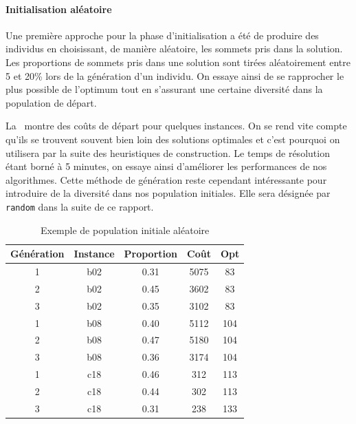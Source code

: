 \documentclass[10pt]{article}
\begin{document}
		\paragraph{Initialisation aléatoire}{
			Une première approche pour la phase d'initialisation a été de produire des individus en choisissant, de manière aléatoire, les sommets pris dans la solution. Les proportions de sommets pris dans une solution sont tirées aléatoirement entre 5 et 20\% lors de la génération d'un individu. On essaye ainsi de se rapprocher le plus possible de l'optimum tout en s'assurant une certaine diversité dans la population de départ.
			
			La~ montre des coûts de départ pour quelques instances. On se rend vite compte qu'ils se trouvent souvent bien loin des solutions optimales et c'est pourquoi on utilisera par la suite des heuristiques de construction. Le temps de résolution étant borné à 5 minutes, on essaye ainsi d'améliorer les performances de nos algorithmes. Cette méthode de génération reste cependant intéressante pour introduire de la diversité dans nos population initiales. Elle sera désignée par \texttt{random} dans la suite de ce rapport.
			
			\begin{table}[h!]
				\centering
				\begin{tabular}{|c|c|c|c|c|}
					\hline
					\textbf{Génération} & \textbf{Instance} & \textbf{Proportion} & \textbf{Coût} & \textbf{Opt} \\
					\hline
					1&b02  & 0.31 & 5075 & 83 \\
					2&b02  & 0.45 & 3602 & 83 \\
					3&b02  & 0.35 & 3102 & 83 \\
					1&b08  & 0.40 & 5112 & 104 \\
					2&b08  & 0.47 & 5180 & 104 \\
					3&b08  & 0.36 & 3174 & 104 \\
					1&c18  & 0.46 & 312 & 113 \\
					2&c18  & 0.44 & 302 & 113 \\
					3&c18  & 0.31 & 238 & 133 \\
					\hline
				\end{tabular}
				\caption{Exemple de population initiale aléatoire}
				\label{tab-randominit}
			\end{table}
			}
\end{document}
